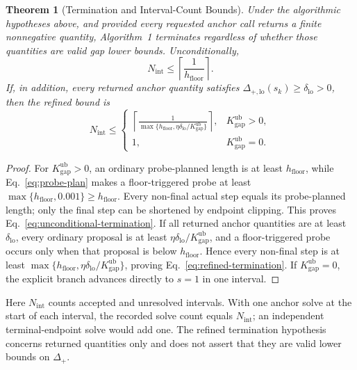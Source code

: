 \documentclass[11pt, a4paper]{article}
\newtheorem{theorem}{Theorem}[section]
\begin{document}
\begin{theorem}[Termination and Interval-Count Bounds]
\label{thm:termination}
Under the algorithmic hypotheses above, and provided every requested anchor call returns a finite nonnegative quantity, Algorithm~1 terminates regardless of whether those quantities are valid gap lower bounds. Unconditionally,
\begin{equation}
\label{eq:unconditional-termination}
N_{\mathrm{int}}\le\left\lceil\frac{1}{h_{\mathrm{floor}}}\right\rceil.
\end{equation}
If, in addition, every returned anchor quantity satisfies $\Delta_{+,\mathrm{lo}}(s_k)\ge\delta_{\mathrm{lo}}>0$, then the refined bound is
\begin{equation}
\label{eq:refined-termination}
N_{\mathrm{int}}\le
\begin{cases}
\displaystyle
\left\lceil
\frac{1}{\max\{h_{\mathrm{floor}},\eta\delta_{\mathrm{lo}}/K_{\mathrm{gap}}^{\mathrm{ub}}\}}
\right\rceil,&K_{\mathrm{gap}}^{\mathrm{ub}}>0,\\[1.2ex]
1,&K_{\mathrm{gap}}^{\mathrm{ub}}=0.
\end{cases}
\end{equation}
\end{theorem}
\begin{proof}
For $K_{\mathrm{gap}}^{\mathrm{ub}}>0$, an ordinary probe-planned length is at least $h_{\mathrm{floor}}$, while Eq.~\eqref{eq:probe-plan} makes a floor-triggered probe at least $\max\{h_{\mathrm{floor}},0.001\}\ge h_{\mathrm{floor}}$. Every non-final actual step equals its probe-planned length; only the final step can be shortened by endpoint clipping. This proves Eq.~\eqref{eq:unconditional-termination}. If all returned anchor quantities are at least $\delta_{\mathrm{lo}}$, every ordinary proposal is at least $\eta\delta_{\mathrm{lo}}/K_{\mathrm{gap}}^{\mathrm{ub}}$, and a floor-triggered probe occurs only when that proposal is below $h_{\mathrm{floor}}$. Hence every non-final step is at least $\max\{h_{\mathrm{floor}},\eta\delta_{\mathrm{lo}}/K_{\mathrm{gap}}^{\mathrm{ub}}\}$, proving Eq.~\eqref{eq:refined-termination}. If $K_{\mathrm{gap}}^{\mathrm{ub}}=0$, the explicit branch advances directly to $s=1$ in one interval.
\end{proof}
Here $N_{\mathrm{int}}$ counts accepted and unresolved intervals. With one anchor solve at the start of each interval, the recorded solve count equals $N_{\mathrm{int}}$; an independent terminal-endpoint solve would add one. The refined termination hypothesis concerns returned quantities only and does not assert that they are valid lower bounds on $\Delta_+$.
\end{document}
